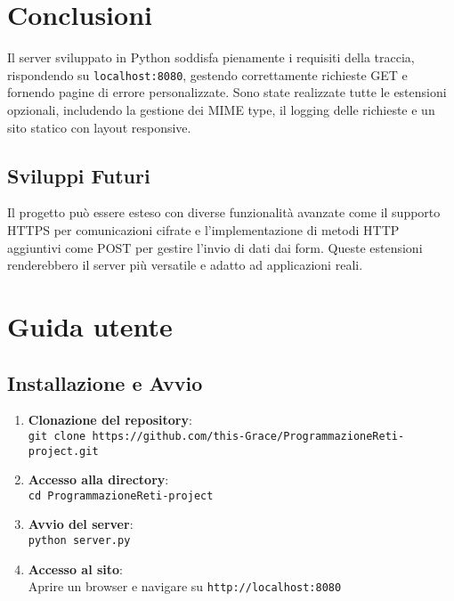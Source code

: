 \documentclass[a4paper,12pt]{report}
\begin{document}
\chapter{Conclusioni}

Il server sviluppato in Python soddisfa pienamente i requisiti della traccia, rispondendo su \texttt{localhost:8080}, gestendo correttamente richieste GET e fornendo pagine di errore personalizzate. 
Sono state realizzate tutte le estensioni opzionali, includendo la gestione dei MIME type, il logging delle richieste e un sito statico con layout responsive. 

\section{Sviluppi Futuri}

Il progetto può essere esteso con diverse funzionalità avanzate come il supporto HTTPS per comunicazioni cifrate e l'implementazione di metodi HTTP aggiuntivi come POST per gestire l'invio di dati dai form. Queste estensioni renderebbero il server più versatile e adatto ad applicazioni reali.

\appendix
\chapter{Guida utente}

\section{Installazione e Avvio}

\begin{enumerate}
    \item \textbf{Clonazione del repository}:\\
    \texttt{git clone https://github.com/this-Grace/ProgrammazioneReti-project.git}

    \item \textbf{Accesso alla directory}:\\
    \texttt{cd ProgrammazioneReti-project}

    \item \textbf{Avvio del server}:\\
    \texttt{python server.py}

    \item \textbf{Accesso al sito}:\\
    Aprire un browser e navigare su \texttt{http://localhost:8080}
\end{enumerate}
\end{document}
